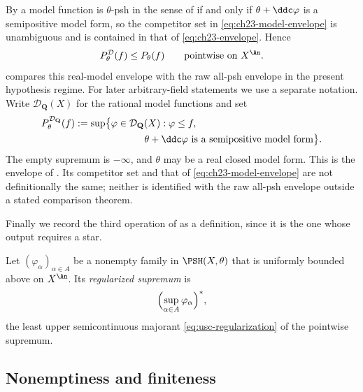 By  a model function is $\theta$-psh in
the sense of  if and only if $\theta+\ddc\varphi$ is
a semipositive model form, so the competitor set in
\eqref{eq:ch23-model-envelope} is unambiguous and is contained in that of
\eqref{eq:ch23-envelope}.  Hence
\begin{equation}\label{eq:ch23-model-envelope-below}
 P^{\mathcal D}_\theta(f)\leq P_\theta(f)
 \qquad\text{pointwise on }X^{\An}.
\end{equation}
 compares this real-model
envelope with the raw all-psh envelope in the present hypothesis regime.
For later arbitrary-field statements we use a separate notation.  Write
$\mathcal D_{\mathbf Q}(X)$ for the rational model functions and set
\[
\begin{aligned}
 P^{\mathcal D_{\mathbf Q}}_\theta(f)
 &:=\sup\bigl\{\varphi\in\mathcal D_{\mathbf Q}(X):\varphi\leq f,\\
 &\hspace{25mm}\theta+\ddc\varphi
                    \text{ is a semipositive model form}\bigr\}.
\end{aligned}
\]
The empty supremum is $-\infty$, and $\theta$ may be a real closed
model form.  This is the envelope
of \cite[\S\S2.2--2.8]{GJKM19}.  Its competitor set and that of
\eqref{eq:ch23-model-envelope} are not definitionally the same; neither
is identified with the raw all-psh envelope outside a stated comparison
theorem.

Finally we record the third operation of  as a
definition, since it is the one whose output requires a star.

\begin{definition}
\label{def:ch23-regularized-sup}
Let $(\varphi_\alpha)_{\alpha\in A}$ be a nonempty family in
$\PSH(X,\theta)$ that is uniformly bounded above on $X^{\An}$.  Its
\emph{regularized supremum} is
\begin{equation}\label{eq:ch23-regularized-sup}
 \Bigl(\sup_{\alpha\in A}\varphi_\alpha\Bigr)^{*},
\end{equation}
the least upper semicontinuous majorant \eqref{eq:usc-regularization} of the
pointwise supremum.
\end{definition}

\subsection{Nonemptiness and finiteness}
\label{sec:ch23-finiteness}

